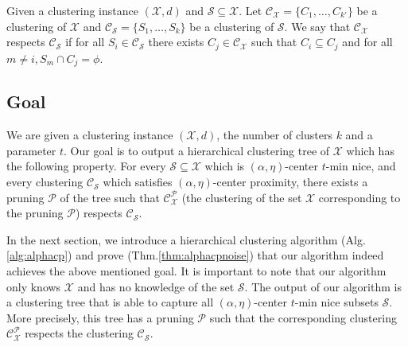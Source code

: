 \documentclass[11pt]{article}
\newcommand{\mc}{\mathcal}
\begin{document}

\begin{definition}[$\mc C_{\mc X}$ respects $\mc C_{\mc S}$] Given a clustering instance $(\mc X, d)$ and $\mc S \subseteq \mc X$. Let $\mc C_{\mc X} = \{C_1, \ldots, C_{k'}\}$ be a clustering of $\mc X$ and $\mc C_{\mc S} = \{S_1, \ldots, S_k\}$ be a clustering of $\mc S$. We say that $\mc C_{\mc X}$ respects $\mc C_{\mc S}$ if for all $S_i \in \mc C_{\mc S}$ there exists $C_j \in \mc C_{\mc X}$ such that $C_i \subseteq C_j$ and for all $m \neq i, S_m \cap C_j = \phi$.
\end{definition}

\subsection{Goal}
We are given a clustering instance $(\mc X, d)$, the number of clusters $k$ and a parameter $t$. Our goal is to output a hierarchical clustering tree of $\mc X$ which has the following property. For every $\mc S \subseteq \mc X$ which is $(\alpha, \eta)$-center $t$-min nice, and every clustering $\mc C_{\mc S}$ which satisfies $(\alpha, \eta)$-center proximity, there exists a pruning $\mc P$ of the tree such that $\mc C_{\mc X}^{\mc P}$ (the clustering of the set $\mc X$ corresponding to the pruning $\mc P$) respects $\mc C_{\mc S}$. 

In the next section, we introduce a hierarchical clustering algorithm (Alg.\ref{alg:alphacp}) and prove (Thm.\ref{thm:alphacpnoise}) that our algorithm indeed achieves the above mentioned goal.
It is important to note that our algorithm only knows $\mc X$ and has no knowledge of the set $\mc S$.
The output of our algorithm is a clustering tree that is able to capture all $(\alpha, \eta)$-center $t$-min nice subsets $\mc S$. More precisely, this tree has a pruning $\mc P$ such that the corresponding clustering $\mc C_{\mc X}^{\mc P}$ respects the clustering $\mc C_{\mc S}$. 
\end{document}
